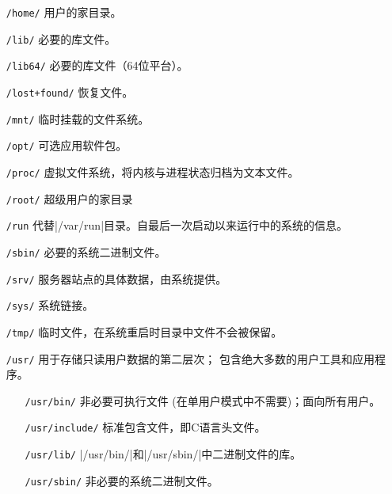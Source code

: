\documentclass[cs4size,a4paper,nofonts]{ctexart}
\begin{document}
\begin{enumerate}
\begin{itemize}
\item[\tt /home/]  用户的家目录。
\item[\tt /lib/]   必要的库文件。
\item[\tt /lib64/]   必要的库文件（64位平台）。
\item[\tt /lost+found/] 恢复文件。
\item[\tt /mnt/]   临时挂载的文件系统。
\item[\tt /opt/]   可选应用软件包。
\item[\tt /proc/]  虚拟文件系统，将内核与进程状态归档为文本文件。
\item[\tt /root/]  超级用户的家目录
\item[\tt /run]
代替|/var/run|目录。自最后一次启动以来运行中的系统的信息。
\item[\tt /sbin/]  必要的系统二进制文件。
\item[\tt /srv/]   服务器站点的具体数据，由系统提供。
\item[\tt /sys/]   系统链接。
\item[\tt /tmp/]   临时文件，在系统重启时目录中文件不会被保留。
\item[\tt /usr/]   用于存储只读用户数据的第二层次； 包含绝大多数的用户工具和应用程序。
\begin{itemize}
\item[\tt /usr/bin/]
非必要可执行文件 (在单用户模式中不需要)；面向所有用户。
\item[\tt /usr/include/]
标准包含文件，即C语言头文件。
\item[\tt /usr/lib/]
|/usr/bin/|和|/usr/sbin/|中二进制文件的库。
\item[\tt /usr/sbin/]
非必要的系统二进制文件。
\end{itemize}


\end{itemize}
\end{enumerate}
\end{document}
